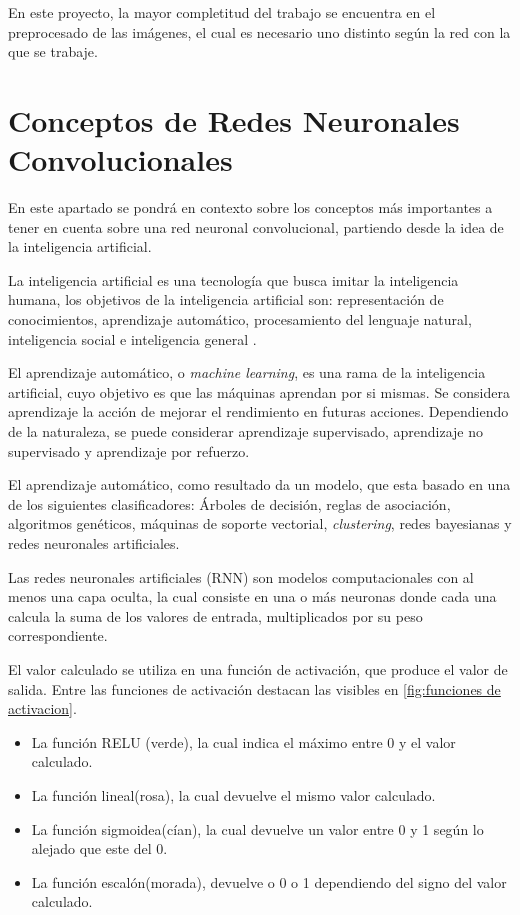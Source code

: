 
En este proyecto, la mayor completitud del trabajo se encuentra en el preprocesado de las imágenes, el cual es necesario uno distinto según la red con la que se trabaje.  

\section{Conceptos de Redes Neuronales Convolucionales}

    En este apartado se pondrá en contexto sobre los conceptos más importantes a tener en cuenta sobre una red neuronal convolucional, partiendo desde la idea de la inteligencia artificial.

    La inteligencia artificial es una tecnología que busca imitar la inteligencia humana, los objetivos de la inteligencia artificial son: representación de conocimientos, aprendizaje automático, procesamiento del lenguaje natural, inteligencia social e inteligencia general \cite{definicion_artificial_intelligence}.

    El aprendizaje automático, o \textit{machine learning}, es una rama de la inteligencia artificial, cuyo objetivo es que las máquinas aprendan por si mismas. Se considera aprendizaje la acción de mejorar el rendimiento en futuras acciones\cite{machine-learning}. Dependiendo de la naturaleza, se puede considerar aprendizaje supervisado, aprendizaje no supervisado y aprendizaje por refuerzo.

    El aprendizaje automático, como resultado da un modelo, que esta basado en una de los siguientes clasificadores:
    Árboles de decisión, reglas de asociación, algoritmos genéticos, máquinas de soporte vectorial, \textit{clustering}, redes bayesianas y redes neuronales artificiales.

    Las redes neuronales artificiales (RNN) son modelos computacionales con al menos una capa oculta\cite{definicion_neural_network}, la cual consiste en una o más neuronas donde cada una calcula la suma de los valores de entrada, multiplicados por su peso correspondiente\cite{definicion_hidden_layer}.

    El valor calculado se utiliza en una función de activación, que produce el valor de salida\cite{definicion_activation_function}. Entre las funciones de activación destacan las visibles en \ref{fig:funciones de activacion}.
    \begin{itemize}
        \item La función RELU (verde), la cual indica el máximo entre 0 y el valor calculado.
        \item La función lineal(rosa), la cual devuelve el mismo valor calculado.
        \item La función sigmoidea(cían), la cual devuelve un valor entre 0 y 1 según lo alejado que este del 0.
        \item La función escalón(morada), devuelve o 0 o 1 dependiendo del signo del valor calculado.
    \end{itemize}
    

